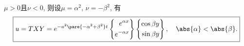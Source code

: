 \documentclass[hidelinks]{ctexart}
\begin{document}
$\mu > 0$且$\nu < 0$, 则设$\mu = \alpha^2$, $\nu = -\beta^2$, 有
\[ \boxed{u = TXY = e^{-a^2\pare{-\alpha^2+\beta^2}t}\left\{ \begin{aligned}
    e^{\alpha x} \\
    e^{-\alpha x}
\end{aligned} \right\}\left\{ \begin{aligned}
    \cos \beta y \\
    \sin \beta y
\end{aligned} \right\},\quad \abs{\alpha} < \abs{\beta}.} \]
\end{document}
